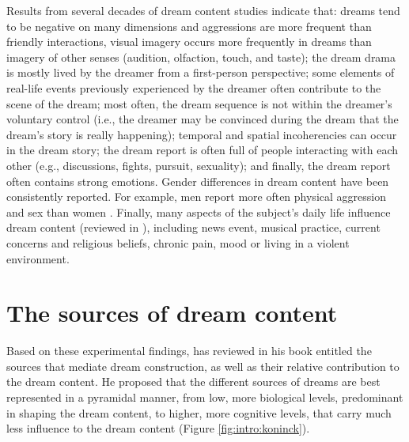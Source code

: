 Results from several decades of dream content studies \citep{hall_content_1966, schwartz_exploration_1999, schredl_characteristics_2010} indicate that: dreams tend to be negative on many dimensions and aggressions are more frequent than friendly interactions, visual imagery occurs more frequently in dreams than imagery of other senses (audition, olfaction, touch, and taste); the dream drama is mostly lived by the dreamer from a first-person perspective; some elements of real-life events previously experienced by the dreamer often contribute to the scene of the dream; most often, the dream sequence is not within the dreamer’s voluntary control (i.e., the dreamer may be convinced during the dream that the dream’s story is really happening); temporal and spatial incoherencies can occur in the dream story; the dream report is often full of people interacting with each other (e.g., discussions, fights, pursuit, sexuality); and finally, the dream report often contains strong emotions.
Gender differences in dream content have been consistently reported. For example, men report more often physical aggression and sex than women \citep{nielsen_typical_2003, schredl_typical_2004}.
Finally, many aspects of the subject’s daily life influence dream content (reviewed in \citealp{ruby_experimental_2011}), including news event, musical practice, current concerns and religious beliefs, chronic pain, mood or living in a violent environment.

\section{The sources of dream content}
\label{sec:dream-content:sources}

Based on these experimental findings, \citet{de_koninck_sleep_2012} has reviewed in his book entitled  the sources that mediate dream construction, as well as their relative contribution to the dream content. He proposed that the different sources of dreams are best represented in a pyramidal manner, from low, more biological levels, predominant in shaping the dream content, to higher, more cognitive levels, that carry much less influence to the dream content (Figure \ref{fig:intro:koninck}).

